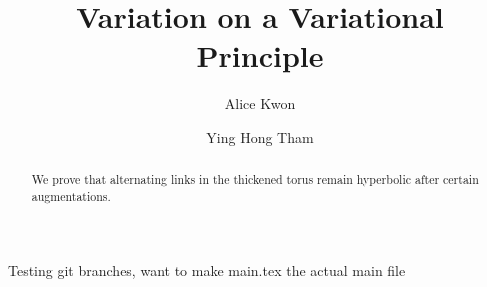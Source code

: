 \documentclass{amsart}
\begin{document}
\title{Variation on a Variational Principle}
\author{Alice Kwon}
   \address{TODO SUNY Maritime address}
\author{Ying Hong Tham}
   \address{Department of Mathematics, Stony Brook University, 
            Stony Brook, NY 11794, USA}

\begin{abstract}
We prove that alternating links in the thickened torus remain hyperbolic
after certain augmentations.
\end{abstract}
\maketitle

Testing git branches, want to make main.tex the actual main file




\end{document}
